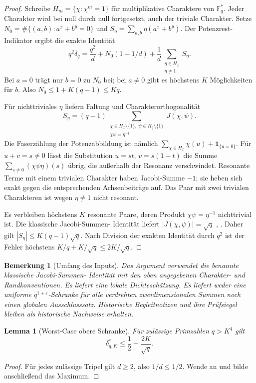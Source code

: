 \documentclass[11pt,a4paper]{article}
\newtheorem{lemma}[theorem]{Lemma}
\newtheorem{remark}[theorem]{Bemerkung}
\begin{document}
\begin{proof}
Schreibe $H_m=\{\chi:\chi^m=1\}$ für multiplikative Charaktere von
$\mathbb F_q^*$. Jeder Charakter wird bei null durch null fortgesetzt,
auch der triviale Charakter. Setze $N_0=\#\{(a,b):a^x+b^y=0\}$
und $S_\eta=\sum_{a,b}\eta(a^x+b^y)$. Der Potenzrest-Indikator ergibt
die exakte Identität
\[
 q^2\delta_q=\frac{q^2}{d}
       +N_0(1-1/d)+\frac1d\sum_{\substack{\eta\in H_z\\\eta\ne1}}S_\eta.
\]
Bei $a=0$ trägt nur $b=0$ zu $N_0$ bei; bei $a\ne0$ gibt es
höchstens $K$ Möglichkeiten für $b$. Also $N_0\le1+K(q-1)\le Kq$.

Für nichttriviales $\eta$ liefern Faltung und Charakterorthogonalität
\[
 S_\eta=(q-1)
 \sum_{\substack{\chi\in H_x\setminus\{1\},\
                 \psi\in H_y\setminus\{1\}\\
                 \chi\psi=\eta^{-1}}}J(\chi,\psi).
\]
Die Faserzählung der Potenzabbildung ist nämlich
$\sum_{\chi\in H_x}\chi(u)+\mathbf1_{\{u=0\}}$.
Für $u+v=s\ne0$ lässt die Substitution $u=st$, $v=s(1-t)$
die Summe $\sum_{s\ne0}(\chi\psi\eta)(s)$ übrig, die außerhalb
der Resonanz verschwindet. Resonante Terme mit einem trivialen
Charakter haben Jacobi-Summe $-1$; sie heben sich exakt gegen die
entsprechenden Achsenbeiträge auf. Das Paar mit zwei trivialen
Charakteren ist wegen $\eta\ne1$ nicht resonant.

Es verbleiben höchstens $K$ resonante Paare, deren Produkt
$\chi\psi=\eta^{-1}$ nichttrivial ist. Die klassische Jacobi-Summen-
Identität liefert $|J(\chi,\psi)|=\sqrt q$
\cite{Weil1948}, \cite[Kap.~8]{IrelandRosen}. Daher gilt
$|S_\eta|\le K(q-1)\sqrt q$. Nach Division der exakten Identität
durch $q^2$ ist der Fehler höchstens
$K/q+K/\sqrt q\le2K/\sqrt q$.
\end{proof}

\begin{remark}[Umfang des Inputs]
Das Argument verwendet die benannte klassische Jacobi-Summen-
Identität mit den oben angegebenen Charakter- und Randkonventionen.
Es liefert eine lokale Dichteschätzung. Es liefert weder eine uniforme
$q^{1+\varepsilon}$-Schranke für alle verdrehten zweidimensionalen
Summen noch einen globalen Ausschlusssatz. Historische Begleitnotizen
und ihre Prüfsiegel bleiben als historische Nachweise erhalten.
\end{remark}

\begin{lemma}[Worst-Case obere Schranke]
\label{lem:worstcase}
Für zulässige Primzahlen $q>K^4$ gilt
\[
 \delta_{q,K}^{*}\le\frac12+\frac{2K}{\sqrt q}.
\]
\end{lemma}
\begin{proof}
Für jedes zulässige Tripel gilt $d\ge2$, also $1/d\le1/2$.
Wende  an und bilde anschließend das Maximum.
\end{proof}
\end{document}

